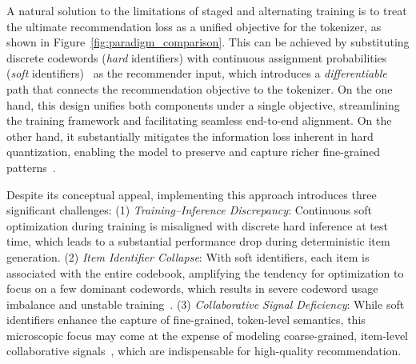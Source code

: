 A natural solution to the limitations of staged and alternating training is to treat the ultimate recommendation loss as a unified objective for the tokenizer, as shown in Figure~\ref{fig:paradigm_comparison}. This can be achieved by substituting discrete codewords (\textit{hard} identifiers) with continuous assignment probabilities (\textit{soft} identifiers)~\cite{BLOGER,MMQ} as the recommender input, which introduces a \textit{differentiable} path that connects the recommendation objective to the tokenizer. On the one hand, this design unifies both components under a single objective, streamlining the training framework and facilitating seamless end-to-end alignment. On the other hand, it substantially mitigates the information loss inherent in hard quantization, enabling the model to preserve and capture richer fine-grained patterns~\cite{IBQ}.


Despite its conceptual appeal, implementing this approach introduces three significant challenges: (1) \textit{Training–Inference Discrepancy}: Continuous soft optimization during training is misaligned with discrete hard inference at test time, which leads to a substantial performance drop during deterministic item generation. (2) \textit{Item Identifier Collapse}: 
With soft identifiers, each item is associated with the entire codebook, amplifying the tendency for optimization to focus on a few dominant codewords, which results in severe codeword usage imbalance and unstable training~\cite{EdVAE,Zhu_2025_ICCV}.
(3) \textit{Collaborative Signal Deficiency}: 
While soft identifiers enhance the capture of fine-grained, token-level semantics, this microscopic focus may come at the expense of modeling coarse-grained, item-level collaborative signals~\cite{BinLLM,CoLLM,DiscRec}, which are indispensable for high-quality recommendation.

